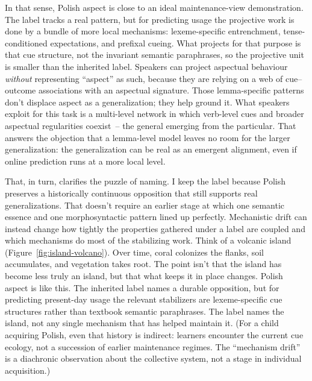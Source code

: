 In that sense, Polish aspect is close to an ideal maintenance-view demonstration. The label tracks a real pattern, but for predicting usage the projective work is done by a bundle of more local mechanisms: lexeme-specific entrenchment, tense-conditioned expectations, and prefixal cueing. What projects for that purpose is that cue structure, not the invariant semantic paraphrases, so the projective unit is smaller than the inherited label. Speakers can project aspectual behaviour \emph{without} representing \enquote{aspect} as such, because they are relying on a web of cue--outcome associations with an aspectual signature. Those lemma-specific patterns don't displace aspect as a generalization; they help ground it. What speakers exploit for this task is a multi-level network in which verb-level cues and broader aspectual regularities coexist~-- the general emerging from the particular. That answers the objection that a lemma-level model leaves no room for the larger generalization: the generalization can be real as an emergent alignment, even if online prediction runs at a more local level.

That, in turn, clarifies the puzzle of naming. I keep the label  because Polish preserves a historically continuous opposition that still supports real generalizations. That doesn't require an earlier stage at which one semantic essence and one morphosyntactic pattern lined up perfectly. Mechanistic drift can instead change how tightly the properties gathered under a label are coupled and which mechanisms do most of the stabilizing work. Think of a volcanic island (Figure~\ref{fig:island-volcano}). Over time, coral colonizes the flanks, soil accumulates, and vegetation takes root. The point isn't that the island has become less truly an island, but that what keeps it in place changes. Polish aspect is like this. The inherited label names a durable opposition, but for predicting present-day usage the relevant stabilizers are lexeme-specific cue structures rather than textbook semantic paraphrases. The label names the island, not any single mechanism that has helped maintain it. (For a child acquiring Polish, even that history is indirect: learners encounter the current cue ecology, not a succession of earlier maintenance regimes. The \enquote{mechanism drift} is a diachronic observation about the collective system, not a stage in individual acquisition.)

